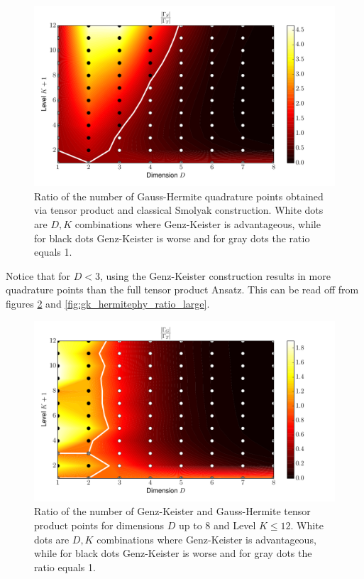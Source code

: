 \documentclass[a4paper,10pt]{article}
\begin{document}
\begin{figure}[h]
  \centering
  \includegraphics[width=0.8\linewidth]{./img/smol_hermitephy_ratio.pdf}
  \caption{Ratio of the number of Gauss-Hermite quadrature points obtained
  via tensor product and classical Smolyak construction. White dots are $D,K$
  combinations where Genz-Keister is advantageous, while for black dots
  Genz-Keister is worse and for gray dots the ratio equals 1.}
  \label{fig:smol_hermitephy_ratio}
\end{figure}

Notice that for $D < 3$, using the Genz-Keister construction results
in more quadrature points than the full tensor product Ansatz. This
can be read off from figures \ref{fig:gk_hermitephy_ratio}
and \ref{fig:gk_hermitephy_ratio_large}.

\begin{figure}[h]
  \centering
  \includegraphics[width=0.8\linewidth]{./img/gk_hermitephy_ratio.pdf}
  \caption{Ratio of the number of Genz-Keister and Gauss-Hermite tensor product
  points for dimensions $D$ up to 8 and Level $K \leq 12$. White dots are $D,K$
  combinations where Genz-Keister is advantageous, while for black dots
  Genz-Keister is worse and for gray dots the ratio equals 1.}
  \label{fig:gk_hermitephy_ratio}
\end{figure}
\end{document}

